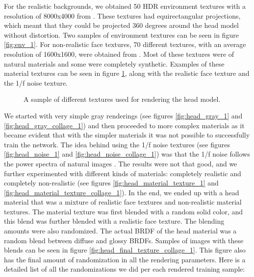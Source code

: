 For the realistic backgrounds, we obtained 50 \ac{HDR} environment textures with a resolution of 8000x4000 from \textcite{sibl}. These textures had equirectangular projections, which meant that they could be projected 360 degrees around the head model without distortion. Two samples of environment textures can be seen in figure \ref{fig:env_1}. For non-realistic face textures, 70 different textures, with an average resolution of 1600x1600, were obtained from \textcite{textures}. Most of these textures were of natural materials and some were completely synthetic. Examples of these material textures can be seen in figure \ref{fig:face_textures_1}, along with the realistic face texture and the 1/f noise texture.

\begin{figure}
    \hfill
    \hfill
    \hfill
    \hfill
    \hfill
    \hfill
    \caption[Head model textures]{A sample of different textures used for rendering the head model.}
    \label{fig:face_textures_1}
\end{figure}

We started with very simple gray renderings (see figures \ref{fig:head_gray_1} and \ref{fig:head_gray_collage_1}) and then proceeded to more complex materials as it became evident that with the simpler materials it was not possible to successfully train the network. The idea behind using the 1/f noise textures (see figures \ref{fig:head_noise_1} and \ref{fig:head_noise_collage_1}) was that the 1/f noise follows the power spectra of natural images \cite{Schaaf1996}. The results were not that good, and we further experimented with different kinds of materials: completely realistic and completely non-realistic (see figures \ref{fig:head_material_texture_1} and \ref{fig:head_material_texture_collage_1}). In the end, we ended up with a head material that was a mixture of realistic face textures and non-realistic material textures. The material texture was first blended with a random solid color, and this blend was further blended with a realistic face texture. The blending amounts were also randomized. The actual \ac{BRDF} of the head material was a random blend between diffuse and glossy \acp{BRDF}. Samples of images with these blends can be seen in figure \ref{fig:head_final_texture_collage_1}. This figure also has the final amount of randomization in all the rendering parameters. Here is a detailed list of all the randomizations we did per each rendered training sample:

